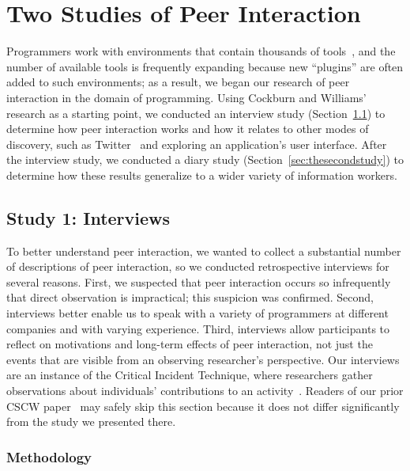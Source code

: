 \documentclass[smallextended]{svjour3}
\newcommand\discovery{peer interaction\xspace}
\newcommand\DisCovery{Peer Interaction\xspace}
\begin{document}
\section{Two Studies of \DisCovery}\label{sec:practice}

\noindent
Programmers work with environments that contain thousands
of tools~\cite{murphyHill12c}, and the number of available tools is frequently expanding 
because new ``plugins'' are often added to such environments;
as a result, we began our research of \discovery in the domain of programming.
Using Cockburn and Williams' research as a starting point, we conducted 
an interview study (Section~\ref{sec:thefirststudy})
to determine how \discovery works and how it relates to other
modes of discovery, such as Twitter~\cite{twitter} and exploring an application's user
interface. 
After the interview study, we conducted a diary study 
(Section~\ref{sec:thesecondstudy})
to determine how these results generalize
to a wider variety of information workers.

\subsection{Study 1: Interviews}\label{sec:thefirststudy}

\noindent
To better understand \discovery, we wanted to collect a substantial number of
descriptions of \discovery, so
we conducted retrospective interviews
for several reasons.
First, we suspected that \discovery occurs so infrequently that
direct observation is impractical; this suspicion was confirmed.
Second, interviews better enable us to speak with a variety of programmers at
different companies and with varying experience.
Third, interviews allow participants to reflect on motivations and long-term
effects of \discovery, not just the events that are visible from an
observing researcher's perspective.
Our interviews are an instance of the Critical Incident Technique, where
researchers gather observations about individuals' contributions to 
an activity~\cite{flanagan1954critical}. 
Readers of our prior CSCW paper~\cite{murphy-hill11:peer} may safely skip
this section because it does not differ significantly from the study we presented
there.

\subsubsection{Methodology}
\end{document}
